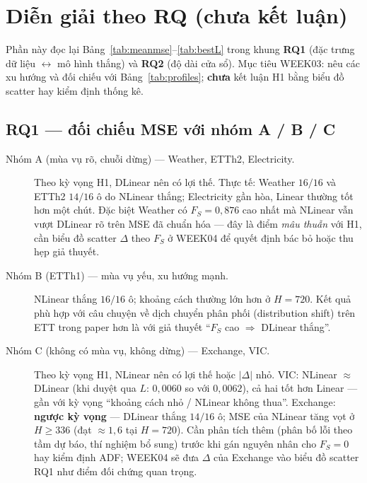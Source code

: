 \section{Diễn giải theo RQ (chưa kết luận)}
\label{sec:discussion}

Phần này đọc lại Bảng~\ref{tab:meanmse}--\ref{tab:bestL} trong khung
\textbf{RQ1} (đặc trưng dữ liệu \(\leftrightarrow\) mô hình thắng) và \textbf{RQ2} (độ dài cửa sổ).
Mục tiêu WEEK03: nêu các xu hướng và đối chiếu với Bảng~\ref{tab:profiles};
\textbf{chưa} kết luận H1 bằng biểu đồ scatter hay kiểm định thống kê.

\subsection{RQ1 --- đối chiếu MSE với nhóm A / B / C}

\begin{description}
  \item[Nhóm A (mùa vụ rõ, chuỗi dừng) --- Weather, ETTh2, Electricity.]
        Theo kỳ vọng H1, DLinear nên có lợi thế.
        Thực tế: Weather \(16/16\) và ETTh2 \(14/16\) ô do NLinear thắng;
        Electricity gần hòa, Linear thường tốt hơn một chút.
        Đặc biệt Weather có \(F_S{=}0{,}876\) cao nhất mà NLinear vẫn vượt DLinear rõ
        trên MSE đã chuẩn hóa --- đây là điểm \emph{mâu thuẫn} với H1, cần biểu đồ scatter
        \(\Delta\) theo \(F_S\) ở WEEK04 để quyết định bác bỏ hoặc thu hẹp giả thuyết.

  \item[Nhóm B (ETTh1) --- mùa vụ yếu, xu hướng mạnh.]
        NLinear thắng \(16/16\) ô; khoảng cách thường lớn hơn ở \(H{=}720\).
        Kết quả phù hợp với câu chuyện về dịch chuyển phân phối (distribution shift) trên ETT trong
        paper \cite{zeng2023ltsf} hơn là với giả thuyết ``\(F_S\) cao \(\Rightarrow\) DLinear thắng''.

  \item[Nhóm C (không có mùa vụ, không dừng) --- Exchange, VIC.]
        Theo kỳ vọng H1, NLinear nên có lợi thế hoặc \(\lvert\Delta\rvert\) nhỏ.
        VIC: NLinear \(\approx\) DLinear (khi duyệt qua \(L\): \(0{,}0060\) so với \(0{,}0062\)),
        cả hai tốt hơn Linear --- gần với kỳ vọng ``khoảng cách nhỏ / NLinear không thua''.
        Exchange: \textbf{ngược kỳ vọng} --- DLinear thắng \(14/16\) ô;
        MSE của NLinear tăng vọt ở \(H \ge 336\) (đạt \(\approx 1{,}6\) tại \(H{=}720\)).
        Cần phân tích thêm (phân bố lỗi theo tầm dự báo, thí nghiệm bổ sung) trước khi gán nguyên nhân
        cho \(F_S{=}0\) hay kiểm định ADF; WEEK04 sẽ đưa \(\Delta\) của Exchange vào biểu đồ scatter RQ1
        như điểm đối chứng quan trọng.
\end{description}

